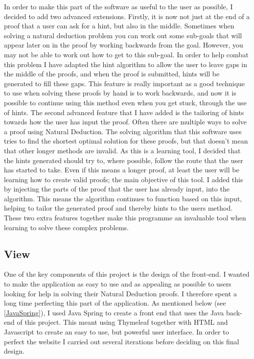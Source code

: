 In order to make this part of the software as useful to the user as possible, I decided to add two advanced extensions. Firstly, it is now not just at the end of a proof that a user can ask for a hint, but also in the middle. Sometimes when solving a natural deduction problem you can work out some sub-goals that will appear later on in the proof by working backwards from the goal. However, you may not be able to work out how to get to this sub-goal. In order to help combat this problem I have adapted the hint algorithm to allow the user to leave gaps in the middle of the proofs, and when the proof is submitted, hints will be generated to fill these gaps. This feature is really important as a good technique to use when solving these proofs by hand is to work backwards, and now it is possible to continue using this method even when you get stuck, through the use of hints. The second advanced feature that I have added is the tailoring of hints towards how the user has input the proof. Often there are multiple ways to solve a proof using Natural Deduction. The solving algorithm that this software uses tries to find the shortest optimal solution for these proofs, but that doesn't mean that other longer methods are invalid. As this is a learning tool, I decided that the hints generated should try to, where possible, follow the route that the user has started to take. Even if this means a longer proof, at least the user will be learning how to create valid proofs; the main objective of this tool. I added this by injecting the parts of the proof that the user has already input, into the algorithm. This means the algorithm continues to function based on this input, helping to tailor the generated proof and thereby hints to the users method. These two extra features together make this programme an invaluable tool when learning to solve these complex problems. 

\subsection{View}

One of the key components of this project is the design of the front-end. I wanted to make the application as easy to use and as appealing as possible to users looking for help in solving their Natural Deduction proofs. I therefore spent a long time perfecting this part of the application. As mentioned below (see \ref{JavaSpring}), I used Java Spring to create a front end that uses the Java back-end of this project. This meant using Thymeleaf together with HTML and Javascript to create an easy to use, but powerful user interface. In order to perfect the website I carried out several iterations before deciding on this final design.

